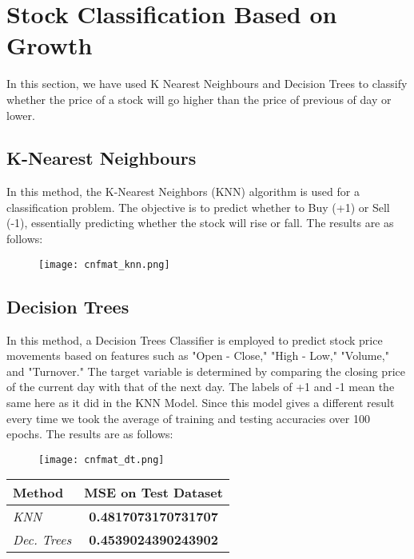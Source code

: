 \documentclass{article}
\begin{document}
\section{Stock Classification Based on Growth}
In this section, we have used K Nearest Neighbours and Decision Trees to classify whether the price of a stock will go higher than the price of previous of day or lower. 

\subsection{K-Nearest Neighbours}
In this method, the K-Nearest Neighbors (KNN) algorithm is used for a classification problem. The objective is to predict whether to Buy (+1) or Sell (-1), essentially predicting whether the stock will rise or fall. The results are as follows:

\begin{figure}[H]
    \centering
    \texttt{[image: cnfmat\_knn.png]}
    \label{fig:enter-label}
\end{figure}

\subsection{Decision Trees}
In this method, a Decision Trees Classifier is employed to predict stock price movements based on features such as "Open - Close," "High - Low," "Volume," and "Turnover." The target variable is determined by comparing the closing price of the current day with that of the next day. The labels of +1 and -1 mean the same here as it did in the KNN Model. Since this model gives a different result every time we took the average of training and testing accuracies over 100 epochs. The results are as follows:

\begin{figure}[H]
    \centering
    \texttt{[image: cnfmat\_dt.png]}
    \label{fig:enter-label}
\end{figure}

\begin{table}[h]
    \centering
    \begin{tabular}{l c} 
        \toprule
        \textbf{Method} & \textbf{MSE on Test Dataset} \\
        \midrule
        \emph{KNN} & \textbf{0.4817073170731707} \\
        \emph{Dec. Trees} & \textbf{0.4539024390243902} \\
        \bottomrule
    \end{tabular}
    \label{tab:mean_squared_error}
\end{table}
\end{document}
